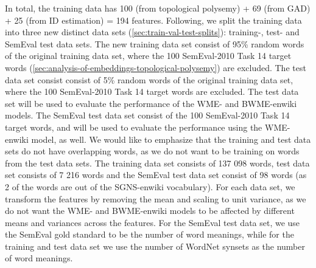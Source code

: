 In total, the training data has 100 (from topological polysemy) + 69 (from GAD) + 25 (from ID estimation) = 194 features. Following, we split the training data into three new distinct data sets (\cref{sec:train-val-test-splits}): training-, test- and SemEval test data sets. The new training data set consist of 95\% random words of the original training data set, where the 100 SemEval-2010 Task 14 target words (\cref{sec:analysis-of-embeddings-topological-polysemy}) are excluded. The test data set consist consist of 5\% random words of the original training data set, where the 100 SemEval-2010 Task 14 target words are excluded. The test data set will be used to evaluate the performance of the WME- and BWME-enwiki models. The SemEval test data set consist of the 100 SemEval-2010 Task 14 target words, and will be used to evaluate the performance using the WME-enwiki model, as well. We would like to emphasize that the training and test data sets do not have overlapping words, as we do not want to be training on words from the test data sets. The training data set consists of 137 098 words, test data set consists of 7 216 words and the SemEval test data set consist of 98 words (as 2 of the words are out of the SGNS-enwiki vocabulary). For each data set, we transform the features by removing the mean and scaling to unit variance, as we do not want the WME- and BWME-enwiki models to be affected by different means and variances across the features. For the SemEval test data set, we use the SemEval gold standard to be the number of word meanings, while for the training and test data set we use the number of WordNet synsets as the number of word meanings.

